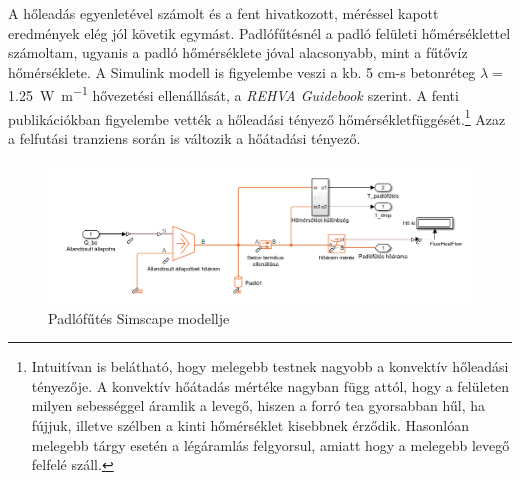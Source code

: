 A hőleadás egyenletével számolt és a fent hivatkozott, méréssel kapott eredmények elég jól követik egymást. Padlófűtésnél a padló felületi hőmérséklettel számoltam, ugyanis a padló hőmérséklete jóval alacsonyabb, mint a fűtővíz hőmérséklete. A Simulink modell is figyelembe veszi a kb. 5 cm-s betonréteg $\lambda=$\SI{1.25}{\watt\per\metre} hővezetési ellenállását, a \textit{REHVA Guidebook \cite{RehvaGuidebookNo7}} szerint.
A fenti publikációkban figyelembe vették a hőleadási tényező hőmérsékletfüggését.\footnote{Intuitívan is belátható, hogy melegebb testnek nagyobb a konvektív hőleadási tényezője. A konvektív hőátadás mértéke nagyban függ attól, hogy a felületen milyen sebességgel áramlik a levegő, hiszen a forró tea gyorsabban hűl, ha fújjuk, illetve szélben a kinti hőmérséklet kisebbnek érződik. Hasonlóan melegebb tárgy esetén a légáramlás felgyorsul, amiatt hogy a melegebb levegő felfelé száll.} %
Azaz a felfutási tranziens során is változik a hőátadási tényező.

\begin{figure}[H]
	\centering
	\includegraphics[trim=0 0 0 0, clip,width=\textwidth]{figures/simscape/padlo}
	\caption{Padlófűtés Simscape modellje}
	\label{fig:SimscapePadlo}
\end{figure}


\pagebreak
